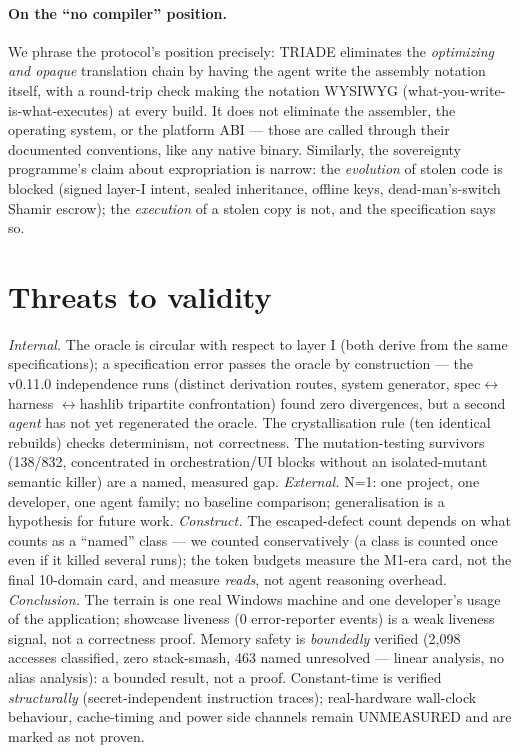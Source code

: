 \documentclass[11pt,a4paper]{article}
\begin{document}
\paragraph{On the ``no compiler'' position.} We phrase the protocol's
position precisely: TRIADE eliminates the \emph{optimizing and opaque}
translation chain by having the agent write the assembly notation itself,
with a round-trip check making the notation WYSIWYG
(what-you-write-is-what-executes) at every build. It does not eliminate
the assembler, the operating system, or the platform ABI --- those are
called through their documented conventions, like any native binary.
Similarly, the sovereignty programme's claim about expropriation is
narrow: the \emph{evolution} of stolen code is blocked (signed layer-I
intent, sealed inheritance, offline keys, dead-man's-switch Shamir
escrow); the \emph{execution} of a stolen copy is not, and the
specification says so.

\section{Threats to validity}\label{sec:threats}

\emph{Internal.} The oracle is circular with respect to layer I
(both derive from the same specifications); a specification error passes
the oracle by construction --- the v0.11.0 independence runs (distinct
derivation routes, system generator, spec$\leftrightarrow$harness
$\leftrightarrow$hashlib tripartite confrontation) found zero
divergences, but a second \emph{agent} has not yet regenerated the
oracle. The crystallisation rule (ten identical rebuilds) checks
determinism, not correctness. The mutation-testing survivors (138/832,
concentrated in orchestration/UI blocks without an isolated-mutant
semantic killer) are a named, measured gap. \emph{External.} N=1: one
project, one developer, one agent family; no baseline comparison;
generalisation is a hypothesis for future work. \emph{Construct.} The
escaped-defect count depends on what counts as a ``named'' class --- we
counted conservatively (a class is counted once even if it killed several
runs); the token budgets measure the M1-era card, not the final
10-domain card, and measure \emph{reads}, not agent reasoning overhead.
\emph{Conclusion.} The terrain is one real Windows machine and one
developer's usage of the application; showcase liveness (0 error-reporter
events) is a weak liveness signal, not a correctness proof. Memory safety
is \emph{boundedly} verified (2{,}098 accesses classified, zero
stack-smash, 463 named unresolved --- linear analysis, no alias
analysis): a bounded result, not a proof. Constant-time is verified
\emph{structurally} (secret-independent instruction traces); real-hardware
wall-clock behaviour, cache-timing and power side channels remain
UNMEASURED and are marked as not proven.
\end{document}
